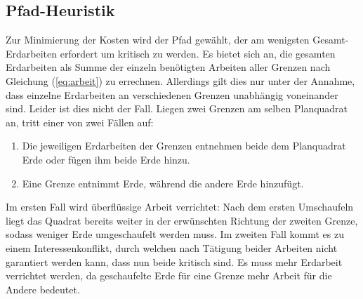 \documentclass[a4paper, 12pt]{scrartcl}
\begin{document}
\subsection{Pfad-Heuristik}
Zur Minimierung der Kosten wird der Pfad gewählt, der am wenigsten Gesamt-Erdarbeiten erfordert um kritisch zu werden. Es bietet sich an, die gesamten Erdarbeiten als Summe der einzeln benötigten Arbeiten aller Grenzen nach Gleichung (\ref{eq:arbeit}) zu errechnen. Allerdings gilt dies nur unter der Annahme, dass einzelne Erdarbeiten an verschiedenen Grenzen unabhängig voneinander sind. Leider ist dies nicht der Fall. Liegen zwei Grenzen am selben Planquadrat an, tritt einer von zwei Fällen auf:
\begin{enumerate}
	\item Die jeweiligen Erdarbeiten der Grenzen entnehmen beide dem Planquadrat Erde oder fügen ihm beide Erde hinzu.
	\item Eine Grenze entnimmt Erde, während die andere Erde hinzufügt.
\end{enumerate}
Im ersten Fall wird überflüssige Arbeit verrichtet: Nach dem ersten Umschaufeln liegt das Quadrat bereits weiter in der erwünschten Richtung der zweiten Grenze, sodass weniger Erde umgeschaufelt werden muss. Im zweiten Fall kommt es zu einem Interessenkonflikt, durch welchen nach Tätigung beider Arbeiten nicht garantiert werden kann, dass nun beide kritisch sind. Es muss mehr Erdarbeit verrichtet werden, da geschaufelte Erde für eine Grenze mehr Arbeit für die Andere bedeutet.
\end{document}

